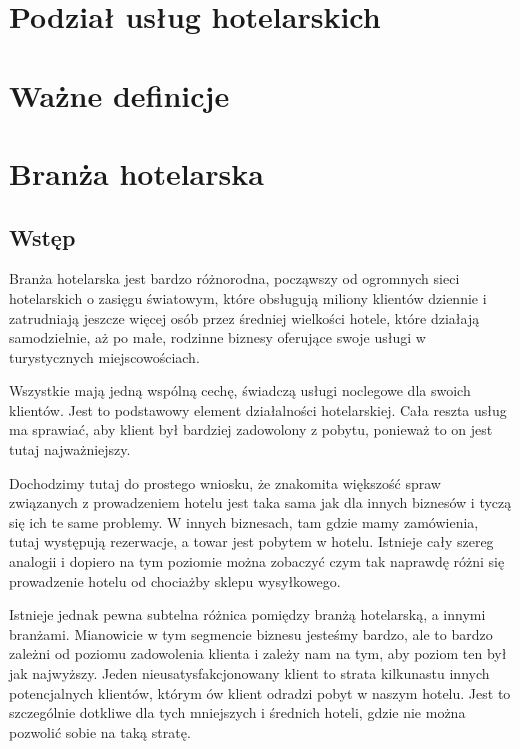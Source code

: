 \documentclass[a4paper,onecolumn,oneside,11pt,wide,floatssmall]{mwrep}
\theoremstyle{definition}
\theoremstyle{plain}%
\theoremstyle{remark}
\begin{document}
\section{Podział usług hotelarskich}   

\section{Ważne definicje} 





\section{Branża hotelarska}

\subsection{Wstęp}

Branża hotelarska jest bardzo różnorodna, począwszy od ogromnych sieci
hotelarskich o zasięgu światowym, które obsługują miliony klientów dziennie i zatrudniają
 jeszcze więcej osób przez średniej wielkości hotele, które działają
 samodzielnie, aż po małe, rodzinne biznesy oferujące swoje usługi
 w turystycznych miejscowościach.
 
  Wszystkie mają jedną wspólną cechę,
 świadczą usługi noclegowe dla swoich klientów. Jest to podstawowy element
 działalności hotelarskiej. Cała reszta usług ma sprawiać, aby klient był
 bardziej zadowolony z pobytu, ponieważ to on jest tutaj najważniejszy.
 
  Dochodzimy tutaj do prostego wniosku, że znakomita
 większość spraw związanych z prowadzeniem hotelu jest taka sama jak dla innych
 biznesów i tyczą się ich te same problemy. W innych biznesach, tam gdzie mamy
 zamówienia, tutaj występują rezerwacje, a towar jest pobytem w hotelu. Istnieje
 cały szereg analogii i dopiero na tym poziomie można zobaczyć czym tak naprawdę
 różni się prowadzenie hotelu od chociażby sklepu wysyłkowego.
 
 Istnieje jednak pewna subtelna różnica pomiędzy branżą hotelarską, a innymi
 branżami. Mianowicie w tym segmencie biznesu jesteśmy bardzo, ale to bardzo
 zależni od poziomu zadowolenia klienta i zależy nam na tym, aby poziom ten był
 jak najwyższy. Jeden nieusatysfakcjonowany klient to strata kilkunastu
 innych potencjalnych klientów, którym ów klient odradzi pobyt w naszym hotelu.
 Jest to szczególnie dotkliwe dla tych mniejszych i średnich hoteli, gdzie nie
 można pozwolić sobie na taką stratę.
\end{document}
